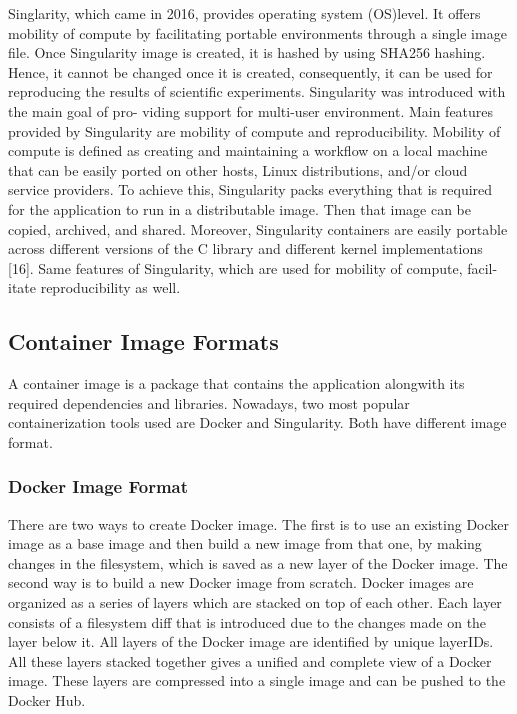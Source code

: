 \documentclass[a4paper,num-refs]{oup-contemporary}
\begin{document}
Singlarity, which came in 2016, provides operating system (OS)level.
It offers mobility of compute by facilitating portable environments 
through a single image file. Once Singularity image
is created, it is hashed by using SHA256 hashing. Hence, it cannot be changed
once it is created, consequently, it can be used for reproducing the results of
scientific experiments. Singularity was introduced with the main goal of pro-
viding support for multi-user environment. Main features provided by
Singularity are mobility of compute and reproducibility.
Mobility of compute is defined as creating and maintaining a workflow on
a local machine that can be easily ported on other hosts, Linux distributions,
and/or cloud service providers. To achieve this, Singularity packs everything
that is required for the application to run in a distributable image. Then that
image can be copied, archived, and shared. Moreover, Singularity containers
are easily portable across different versions of the C library and different kernel
implementations [16].
Same features of Singularity, which are used for mobility of compute, facil-
itate reproducibility as well.

\subsection{Container Image Formats}

A container image is a package that contains the application alongwith its
required dependencies and libraries.
Nowadays, two most popular containerization tools used are Docker and Singularity.
Both have different image format.

\subsubsection{Docker Image Format}

There are two ways to create Docker image. The first is to use an existing
Docker image as a base image and then build a new image from that one, by
making changes in the filesystem, which is saved as a new layer of the
Docker image. The second way is to build a new Docker image from scratch.
Docker images are organized as a series of layers which are stacked on top
of each other. Each layer consists of a filesystem diff that is introduced
due to the changes made on the layer below it. All layers of the Docker image
are identified by unique layerIDs. All these layers stacked together gives a
unified and complete view of a Docker image. These layers are
compressed into a single image and can be pushed to the Docker Hub.
\end{document}
